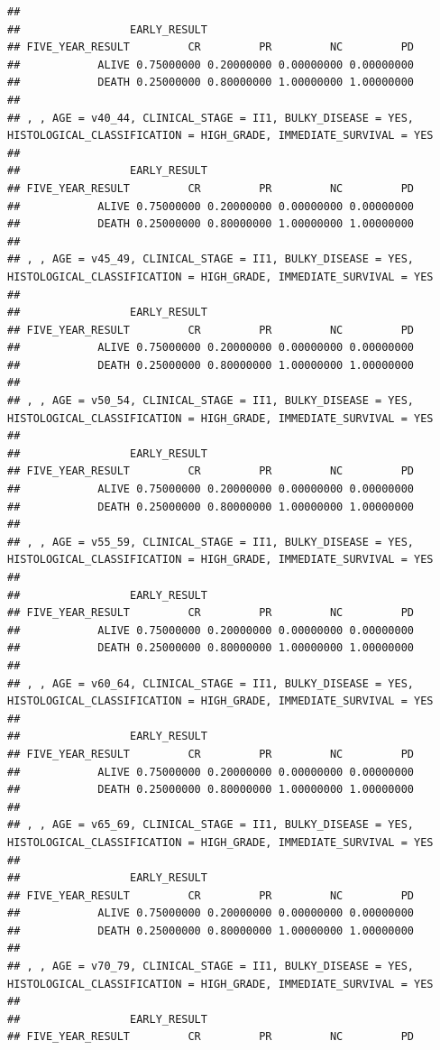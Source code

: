 \documentclass[]{article}
\begin{document}
\begin{verbatim}
## 
##                 EARLY_RESULT
## FIVE_YEAR_RESULT         CR         PR         NC         PD
##            ALIVE 0.75000000 0.20000000 0.00000000 0.00000000
##            DEATH 0.25000000 0.80000000 1.00000000 1.00000000
## 
## , , AGE = v40_44, CLINICAL_STAGE = II1, BULKY_DISEASE = YES, HISTOLOGICAL_CLASSIFICATION = HIGH_GRADE, IMMEDIATE_SURVIVAL = YES
## 
##                 EARLY_RESULT
## FIVE_YEAR_RESULT         CR         PR         NC         PD
##            ALIVE 0.75000000 0.20000000 0.00000000 0.00000000
##            DEATH 0.25000000 0.80000000 1.00000000 1.00000000
## 
## , , AGE = v45_49, CLINICAL_STAGE = II1, BULKY_DISEASE = YES, HISTOLOGICAL_CLASSIFICATION = HIGH_GRADE, IMMEDIATE_SURVIVAL = YES
## 
##                 EARLY_RESULT
## FIVE_YEAR_RESULT         CR         PR         NC         PD
##            ALIVE 0.75000000 0.20000000 0.00000000 0.00000000
##            DEATH 0.25000000 0.80000000 1.00000000 1.00000000
## 
## , , AGE = v50_54, CLINICAL_STAGE = II1, BULKY_DISEASE = YES, HISTOLOGICAL_CLASSIFICATION = HIGH_GRADE, IMMEDIATE_SURVIVAL = YES
## 
##                 EARLY_RESULT
## FIVE_YEAR_RESULT         CR         PR         NC         PD
##            ALIVE 0.75000000 0.20000000 0.00000000 0.00000000
##            DEATH 0.25000000 0.80000000 1.00000000 1.00000000
## 
## , , AGE = v55_59, CLINICAL_STAGE = II1, BULKY_DISEASE = YES, HISTOLOGICAL_CLASSIFICATION = HIGH_GRADE, IMMEDIATE_SURVIVAL = YES
## 
##                 EARLY_RESULT
## FIVE_YEAR_RESULT         CR         PR         NC         PD
##            ALIVE 0.75000000 0.20000000 0.00000000 0.00000000
##            DEATH 0.25000000 0.80000000 1.00000000 1.00000000
## 
## , , AGE = v60_64, CLINICAL_STAGE = II1, BULKY_DISEASE = YES, HISTOLOGICAL_CLASSIFICATION = HIGH_GRADE, IMMEDIATE_SURVIVAL = YES
## 
##                 EARLY_RESULT
## FIVE_YEAR_RESULT         CR         PR         NC         PD
##            ALIVE 0.75000000 0.20000000 0.00000000 0.00000000
##            DEATH 0.25000000 0.80000000 1.00000000 1.00000000
## 
## , , AGE = v65_69, CLINICAL_STAGE = II1, BULKY_DISEASE = YES, HISTOLOGICAL_CLASSIFICATION = HIGH_GRADE, IMMEDIATE_SURVIVAL = YES
## 
##                 EARLY_RESULT
## FIVE_YEAR_RESULT         CR         PR         NC         PD
##            ALIVE 0.75000000 0.20000000 0.00000000 0.00000000
##            DEATH 0.25000000 0.80000000 1.00000000 1.00000000
## 
## , , AGE = v70_79, CLINICAL_STAGE = II1, BULKY_DISEASE = YES, HISTOLOGICAL_CLASSIFICATION = HIGH_GRADE, IMMEDIATE_SURVIVAL = YES
## 
##                 EARLY_RESULT
## FIVE_YEAR_RESULT         CR         PR         NC         PD

\end{verbatim}
\end{document}
